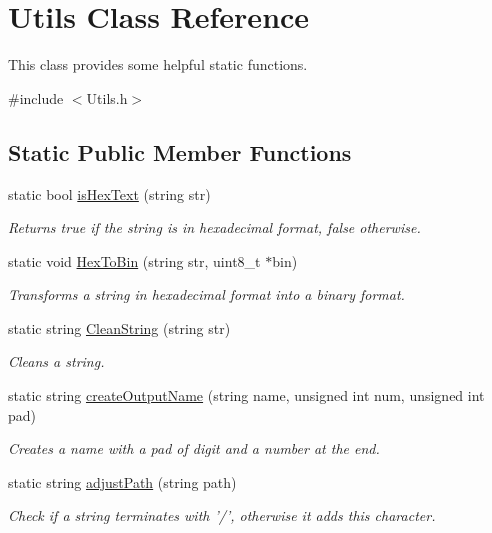 \hypertarget{classUtils}{
\section{Utils Class Reference}
\label{classUtils}
}


This class provides some helpful static functions.  




{\ttfamily \#include $<$Utils.h$>$}

\subsection*{Static Public Member Functions}
\begin{DoxyCompactItemize}
\item 
static bool \hyperlink{classUtils_af5dbc4aa1ac136fac0da4d0ef76c9c84}{isHexText} (string str)
\begin{DoxyCompactList}\small\item\em Returns true if the string is in hexadecimal format, false otherwise. \end{DoxyCompactList}\item 
static void \hyperlink{classUtils_a3aa72fbd6298d4e9aa8e4d805cb0e293}{HexToBin} (string str, uint8\_\-t $\ast$bin)
\begin{DoxyCompactList}\small\item\em Transforms a string in hexadecimal format into a binary format. \end{DoxyCompactList}\item 
static string \hyperlink{classUtils_a8d516ce58623b0b8307337cdccbf24c2}{CleanString} (string str)
\begin{DoxyCompactList}\small\item\em Cleans a string. \end{DoxyCompactList}\item 
static string \hyperlink{classUtils_a5046ca59d4230a434939a9fd2a035442}{createOutputName} (string name, unsigned int num, unsigned int pad)
\begin{DoxyCompactList}\small\item\em Creates a name with a pad of digit and a number at the end. \end{DoxyCompactList}\item 
static string \hyperlink{classUtils_a5880c347609d0b3e0a9269b5ea59bb1e}{adjustPath} (string path)
\begin{DoxyCompactList}\small\item\em Check if a string terminates with '/', otherwise it adds this character. \end{DoxyCompactList}\end{DoxyCompactItemize}


